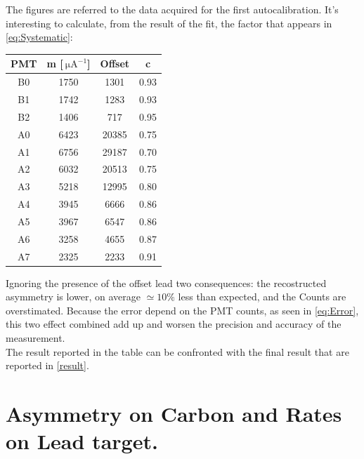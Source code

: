 \newpage
The figures are referred to the data acquired for the first autocalibration. It's interesting to calculate, from the result of the fit, the factor that appears in \ref{eq:Systematic}:

\begin{table}[ht]
\centering
\begin{tabular}{c|c|c|c}
\hline
 PMT & m [$\SI{}{\micro \ampere}^{-1}$] & Offset & c  \\
\hline
 B0  & 1750 &  1301 &  0.93 \\
 B1  & 1742 &  1283 &  0.93 \\
 B2  & 1406 &   717 &  0.95 \\
 A0  & 6423 & 20385 &  0.75 \\
 A1  & 6756 & 29187 &  0.70 \\
 A2  & 6032 & 20513 &  0.75 \\
 A3  & 5218 & 12995 &  0.80 \\
 A4  & 3945 &  6666 &  0.86 \\
 A5  & 3967 &  6547 &  0.86 \\
 A6  & 3258 &  4655 &  0.87 \\
 A7  & 2325 &  2233 &  0.91 \\
\hline
\end{tabular}
\end{table}
Ignoring the presence of the offset lead two consequences: the recostructed asymmetry is lower, on average $ \simeq 10\%$ less than expected, and the Counts are overstimated. Because the error depend on the PMT counts, as seen in \ref{eq:Error}, this two effect combined add up and worsen the precision and accuracy of the measurement.\\
The result reported in the table can be confronted with the final result that are reported in \ref{result}. 

\newpage



\chapter{Asymmetry on Carbon and Rates on Lead target.}


